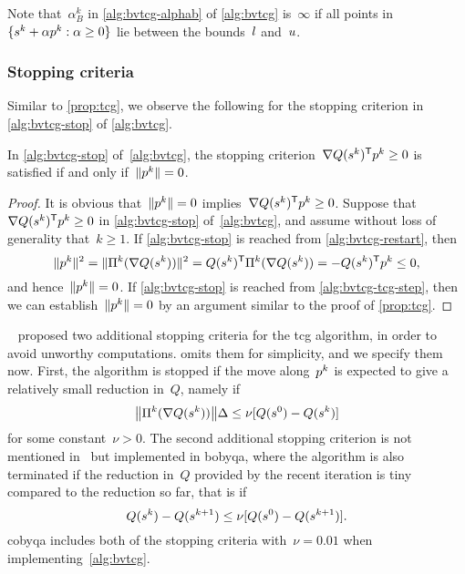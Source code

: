 Note that~$\alpha_B^k$ in \cref{alg:bvtcg-alphab} of \cref{alg:bvtcg} is~$\infty$ if all points in~$\set{\sstep[k] + \alpha \pstep[k] : \alpha \ge 0}$ lie between the bounds~$l$ and~$u$.

\subsubsection{Stopping criteria}

Similar to \cref{prop:tcg}, we observe the following for the stopping criterion in \cref{alg:bvtcg-stop} of \cref{alg:bvtcg}.

\begin{proposition}
    \label{prop:bvtcg}
    In \cref{alg:bvtcg-stop} of~\cref{alg:bvtcg}, the stopping criterion~$\nabla Q (\sstep[k])^{\T} \pstep[k] \ge 0$ is satisfied if and only if~$\norm{\pstep[k]} = 0$.
\end{proposition}

\begin{proof}
    It is obvious that~$\norm{\pstep[k]} = 0$ implies~$\nabla Q (\sstep[k])^{\T} \pstep[k] \ge 0$.
    Suppose that~$\nabla Q (\sstep[k])^{\T} \pstep[k] \ge 0$ in \cref{alg:bvtcg-stop} of~\cref{alg:bvtcg}, and assume without loss of generality that~$k \ge 1$.
    If \cref{alg:bvtcg-stop} is reached from \cref{alg:bvtcg-restart}, then
    \begin{equation*}
        \norm{\pstep[k]}^2 = \norm{\Pi^k(\nabla Q(\sstep[k]))}^2 =  Q (\sstep[k])^{\T}  \Pi^k(\nabla Q(\sstep[k])) = - Q (\sstep[k])^{\T}  \pstep[k] \le 0,
    \end{equation*}
    and hence~$\norm{\pstep[k]} = 0$.
    If \cref{alg:bvtcg-stop} is reached from \cref{alg:bvtcg-tcg-step}, then we can establish~$\norm{\pstep[k]} = 0$ by an argument similar to the proof of \cref{prop:tcg}.
\end{proof}

~\cite[\S~3]{Powell_2009} proposed two additional stopping criteria for the
\gls{tcg} algorithm, in order to avoid unworthy computations.
 omits them for simplicity, and we specify them now.
First, the algorithm is stopped if the move along~$\pstep[k]$ is expected to give a relatively small reduction in~$Q$, namely if
\begin{equation}
    \label{eq:bvtcg-stop1}
    \norm[\big]{\Pi^k(\nabla Q(\sstep[k]))}\rad \le \nu [Q(\sstep[0]) - Q(\sstep[k])]
\end{equation}
for some constant~$\nu > 0$.
The second additional stopping criterion is not mentioned in~\cite{Powell_2009} but implemented in
\gls{bobyqa}, where the algorithm is also terminated if the reduction in~$Q$ provided by the recent iteration is tiny compared to the reduction so far, that is if
\begin{equation}
    \label{eq:bvtcg-stop2}
    Q(\sstep[k]) - Q(\sstep[k + 1]) \le \nu [Q(\sstep[0]) - Q(\sstep[k + 1])].
\end{equation}
\Gls{cobyqa} includes both of the stopping criteria with~$\nu = 0.01$ when implementing~\cref{alg:bvtcg}.


